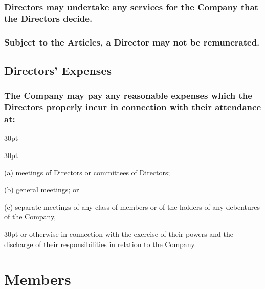 \documentclass[12pt]{article}
\def\clauseindent{30pt}
\newenvironment{subindentlist}{\raggedright\begin{adjustwidth}{\clauseindent}{}\begin{labeledlist}{\clauseindent}}{\end{labeledlist}\end{adjustwidth}}
\begin{document}
\subsubsection[Directors May Undertake Services]{Directors may undertake any services for the Company that the Directors decide.}
\subsubsection[Directors May Not Be Remunerated]{Subject to the Articles, a Director may not be remunerated.}

\subsection{Directors' Expenses}
\subsubsection[Specifics of Directors' Expenses]{The Company may pay any reasonable expenses which the Directors properly incur in connection with their attendance at:}
\begin{subindentlist}
    \item [(a)] meetings of Directors or committees of Directors;
    \item [(b)] general meetings; or
    \item [(c)] separate meetings of any class of members or of the holders of any debentures of the Company,
\end{subindentlist}\begin{adjustwidth}{\clauseindent}{}
or otherwise in connection with the exercise of their powers and the discharge of their responsibilities in relation to the Company.\end{adjustwidth}

\newpage\section*{\huge{Members}}
\end{document}

